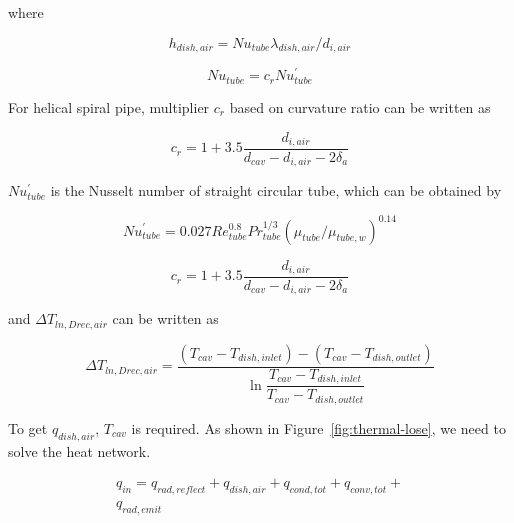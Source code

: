 \documentclass{article}
\begin{document}
where

\begin{equation*}
	h_{dish,air}=Nu_{tube}\lambda_{dish,air}/d_{i,air}
\end{equation*}

\begin{equation*}
	Nu_{tube}=c_rNu_{tube}^{'}
\end{equation*}

For helical spiral pipe, multiplier $c_r$ based on curvature ratio can be written as~\cite{Pablo2008}

\begin{equation*}
	c_{r}=1+3.5\frac{d_{i,air}}{d_{cav}-d_{i,air}-2\delta_{a}}
\end{equation*}

$Nu_{tube}^{'}$ is the Nusselt number of straight circular tube, which can be obtained by~\cite{Serth2007}

\begin{equation*}
	Nu_{tube}^{'}= 0.027Re_{tube}^{0.8}Pr_{tube}^{1/3}(\mu_{tube}/\mu_{tube,w})^{0.14}
\end{equation*}

\begin{equation*}
	c_{r}=1+3.5\frac{d_{i,air}}{d_{cav}-d_{i,air}-2\delta_{a}}
\end{equation*}

and $\Delta{}T_{ln,Drec,air}$ can be written as

\begin{equation*}
	\Delta{}T_{ln,Drec,air}=\frac{(T_{cav}-T_{dish,inlet})-(T_{cav}-T_{dish,outlet})}{\ln\dfrac{T_{cav}-T_{dish,inlet}}{T_{cav}-T_{dish,outlet}}}
\end{equation*}

To get $q_{dish,air}$, $T_{cav}$ is required. As shown in Figure~\ref{fig:thermal-lose}, we need to solve the heat network.

\begin{equation}
\begin{aligned}
	q_{in} = q_{rad,reflect}+q_{dish,air}+q_{cond,tot}+q_{conv,tot}+
	\\q_{rad,emit}\label{eq:q_in sum}
\end{aligned}
\end{equation}
\end{document}
